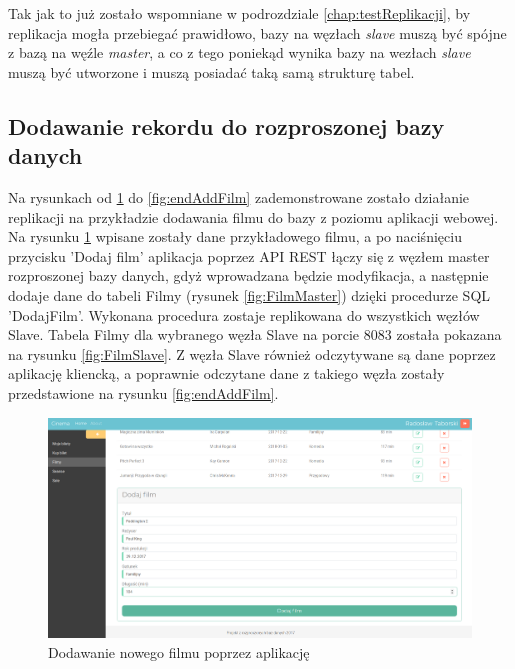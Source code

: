 Tak jak to już zostało wspomniane w podrozdziale \ref{chap:testReplikacji}, by replikacja mogła przebiegać prawidłowo, bazy na węzłach \textit{slave} muszą być spójne z bazą na węźle \textit{master}, a co z tego poniekąd wynika bazy na wezłach \textit{slave} muszą być utworzone i muszą posiadać taką samą strukturę tabel.

\subsection{Dodawanie rekordu do rozproszonej bazy danych}
Na rysunkach od \ref{fig:addFilm} do \ref{fig:endAddFilm} zademonstrowane zostało działanie replikacji na przykładzie dodawania filmu do bazy z poziomu aplikacji webowej.\\

Na rysunku \ref{fig:addFilm} wpisane zostały dane przykładowego filmu, a po naciśnięciu przycisku 'Dodaj film' aplikacja poprzez API REST łączy się z węzłem master rozproszonej bazy danych, gdyż wprowadzana będzie modyfikacja, a następnie dodaje dane do tabeli Filmy (rysunek \ref{fig:FilmMaster}) dzięki procedurze SQL 'DodajFilm'. Wykonana procedura zostaje replikowana do wszystkich węzłów Slave. Tabela Filmy dla wybranego węzła Slave na porcie 8083 została pokazana na rysunku \ref{fig:FilmSlave}. Z węzła Slave również odczytywane są dane poprzez aplikację kliencką, a poprawnie odczytane dane z takiego węzła zostały przedstawione na rysunku \ref{fig:endAddFilm}.

\begin{figure} [H]
	\centering
	\includegraphics[width=1\linewidth]{rozdzial06/5.png}
	\caption{Dodawanie nowego filmu poprzez aplikację}
	\label{fig:addFilm}
\end{figure}

